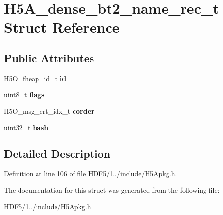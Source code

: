 \hypertarget{struct_h5_a__dense__bt2__name__rec__t}{}\section{H5\+A\+\_\+dense\+\_\+bt2\+\_\+name\+\_\+rec\+\_\+t Struct Reference}
\label{struct_h5_a__dense__bt2__name__rec__t}
\subsection*{Public Attributes}
\begin{DoxyCompactItemize}
\item 
\mbox{\label{struct_h5_a__dense__bt2__name__rec__t_ae0f8173fee2e6678aaf484048c7a0b3d}} 
H5\+O\+\_\+fheap\+\_\+id\+\_\+t {\bfseries id}
\item 
\mbox{\label{struct_h5_a__dense__bt2__name__rec__t_a3a86d48afc4340187d1ca9a5bfc785ea}} 
uint8\+\_\+t {\bfseries flags}
\item 
\mbox{\label{struct_h5_a__dense__bt2__name__rec__t_ad751b51cb1205ab377f639af9625f25a}} 
H5\+O\+\_\+msg\+\_\+crt\+\_\+idx\+\_\+t {\bfseries corder}
\item 
\mbox{\label{struct_h5_a__dense__bt2__name__rec__t_a2c59042bd2954cd5cfe7aac25c81dc4d}} 
uint32\+\_\+t {\bfseries hash}
\end{DoxyCompactItemize}


\subsection{Detailed Description}


Definition at line \hyperlink{_h_d_f5_21_810_81_2include_2_h5_apkg_8h_source_l00106}{106} of file \hyperlink{_h_d_f5_21_810_81_2include_2_h5_apkg_8h_source}{H\+D\+F5/1../include/\+H5\+Apkg.\+h}.



The documentation for this struct was generated from the following file\+:\begin{DoxyCompactItemize}
\item 
H\+D\+F5/1../include/\+H5\+Apkg.\+h\end{DoxyCompactItemize}

